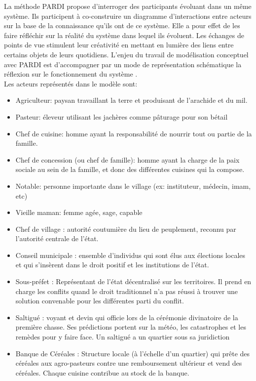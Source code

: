 \vspace{0.5cm}

La méthode PARDI propose d'interroger des participants évoluant dans un même système. Ils participent à co-construire un diagramme d'interactions entre acteurs sur la base de la connaissance qu'ils ont de ce système. Elle a pour effet de les faire réfléchir sur la réalité du système dans lequel ils évoluent. Les échanges de points de vue stimulent leur créativité en mettant en lumière des liens entre certains objets de leurs quotidiens. L'enjeu du travail de modélisation conceptuel avec PARDI est d'accompagner par un mode de représentation schématique la réflexion sur le fonctionnement du système \cite{becu_les_2010}.\\


Les acteurs représentés dans le modèle sont:
\begin{itemize}
  \item Agriculteur: paysan travaillant la terre et produisant de l'arachide et du mil.
  \item Pasteur: éleveur utilisant les jachères comme pâturage pour son bétail
  \item Chef de cuisine: homme ayant la responsabilité de nourrir tout ou partie de la famille.
  \item Chef de concession (ou chef de famille): homme ayant la charge de la paix sociale au sein de la famille, et donc des différentes cuisines qui la compose.
  \item Notable: personne importante dans le village (ex: instituteur, médecin, imam, etc)
  \item Vieille maman:  femme agée, sage, capable
  \item Chef de village : autorité coutumière du lieu de peuplement, reconnu par l'autorité centrale de l'état.
  \item Conseil municipale : ensemble d'individus qui sont élus aux élections locales et qui s'insèrent dans le droit positif et les institutions de l'état.
  \item Sous-préfet : Représentant de l'état décentralisé sur les territoires. Il prend en charge les conflits quand le droit traditionnel n'a pas réussi à trouver une solution convenable pour les différentes parti du conflit.
  \item Saltigué : voyant et devin qui officie lors de la cérémonie divinatoire de la première chasse. Ses prédictions portent sur la météo, les catastrophes et les remèdes pour y faire face. Un saltigué a un quartier sous sa juridiction
  \item Banque de Céréales : Structure locale (à l'échelle d'un quartier) qui prête des céréales aux agro-pasteurs contre une remboursement ultérieur et vend des céréales. Chaque cuisine contribue au stock de la banque.
\end{itemize}

